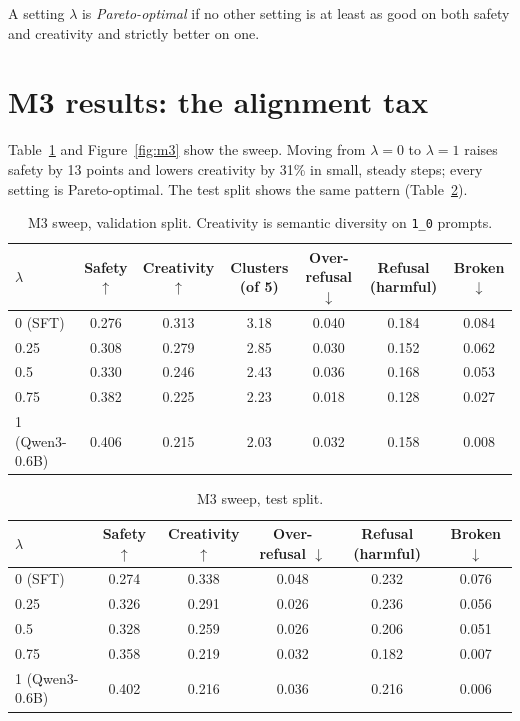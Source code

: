 \documentclass[11pt,a4paper]{article}
\newcommand{\q}[1]{\texttt{#1}}          %
\newcommand{\lam}{\lambda}
\begin{document}
A setting $\lam$ is \emph{Pareto-optimal} if no other setting is at least as good on both safety and creativity and strictly better on one.

\section{M3 results: the alignment tax}
\label{sec:m3-results}

Table~\ref{tab:m3} and Figure~\ref{fig:m3} show the sweep. Moving from $\lam=0$ to $\lam=1$ raises safety by 13 points and lowers creativity by 31\% in small, steady steps; every setting is Pareto-optimal. The test split shows the same pattern (Table~\ref{tab:m3test}).

\begin{table}[h]
  \centering
  \caption{M3 sweep, validation split. Creativity is semantic diversity on \q{1\_0} prompts.}
  \label{tab:m3}
  \small
  \begin{tabular}{lcccccc}
    \toprule
    $\lam$ & Safety $\uparrow$ & Creativity $\uparrow$ & Clusters (of 5) & Over-refusal $\downarrow$ & Refusal (harmful) & Broken $\downarrow$ \\
    \midrule
    0 (SFT) & 0.276 & 0.313 & 3.18 & 0.040 & 0.184 & 0.084 \\
    0.25 & 0.308 & 0.279 & 2.85 & 0.030 & 0.152 & 0.062 \\
    0.5 & 0.330 & 0.246 & 2.43 & 0.036 & 0.168 & 0.053 \\
    0.75 & 0.382 & 0.225 & 2.23 & 0.018 & 0.128 & 0.027 \\
    1 (Qwen3-0.6B) & 0.406 & 0.215 & 2.03 & 0.032 & 0.158 & 0.008 \\
    \bottomrule
  \end{tabular}
\end{table}

\begin{table}[h]
  \centering
  \caption{M3 sweep, test split.}
  \label{tab:m3test}
  \small
  \begin{tabular}{lccccc}
    \toprule
    $\lam$ & Safety $\uparrow$ & Creativity $\uparrow$ & Over-refusal $\downarrow$ & Refusal (harmful) & Broken $\downarrow$ \\
    \midrule
    0 (SFT) & 0.274 & 0.338 & 0.048 & 0.232 & 0.076 \\
    0.25 & 0.326 & 0.291 & 0.026 & 0.236 & 0.056 \\
    0.5 & 0.328 & 0.259 & 0.026 & 0.206 & 0.051 \\
    0.75 & 0.358 & 0.219 & 0.032 & 0.182 & 0.007 \\
    1 (Qwen3-0.6B) & 0.402 & 0.216 & 0.036 & 0.216 & 0.006 \\
    \bottomrule
  \end{tabular}
\end{table}
\end{document}
